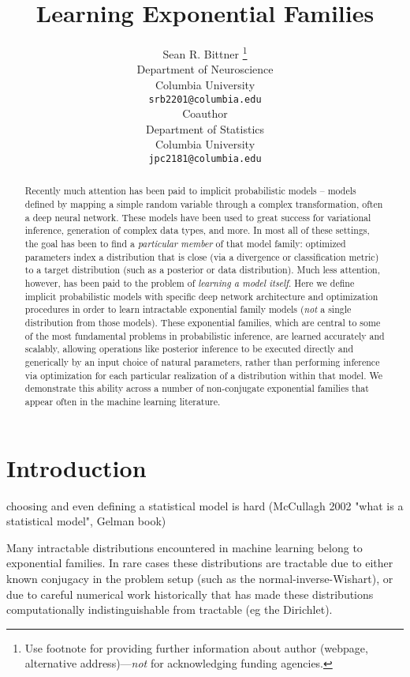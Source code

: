 \documentclass{article}
\title{Learning Exponential Families}
\author{
  Sean R. Bittner \thanks{Use footnote for providing further
    information about author (webpage, alternative
    address)---\emph{not} for acknowledging funding agencies.} \\
  Department of Neuroscience\\
  Columbia University\\
  \texttt{srb2201@columbia.edu} \\
 \And
Coauthor \\
Department of Statistics\\
  Columbia University\\
 \texttt{jpc2181@columbia.edu} \\
}
\begin{document}

\maketitle

\begin{abstract}
  
Recently much attention has been paid to implicit probabilistic models -- models defined by mapping a simple random variable through a complex transformation, often a deep neural network.  These models have been used to great success for variational inference, generation of complex data types, and more.  In most all of these settings, the goal has been to find a \emph{particular member} of that model family: optimized parameters index a distribution that is close (via a divergence or classification metric) to a target distribution (such as a posterior or data distribution).  Much less attention, however, has been paid to the problem of \emph{learning a model itself}.   Here we define implicit probabilistic models with specific deep network architecture and optimization procedures in order to learn intractable exponential family models (\emph{not} a single distribution from those models).  These exponential families, which are central to some of the most fundamental problems in probabilistic inference, are learned accurately and scalably, allowing operations like posterior inference to be executed directly and generically by an input choice of natural parameters, rather than performing inference via optimization for each particular realization of a distribution within that model.  We demonstrate this ability across a number of non-conjugate exponential families that appear often in the machine learning literature.
  
\end{abstract}

\section{Introduction}


choosing and even defining a statistical model is hard (McCullagh 2002 "what is a statistical model", Gelman book)
  
Many intractable distributions encountered in machine learning belong to exponential families.  In rare cases these distributions are tractable due to either known conjugacy in the problem setup (such as the normal-inverse-Wishart), or due to careful numerical work historically that has made these distributions computationally indistinguishable from tractable (eg the Dirichlet).
\end{document}
